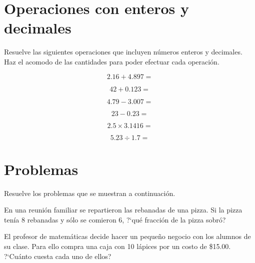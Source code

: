 \documentclass[11pt]{article}
\begin{document}
\vspace{0.7cm}

\section{Operaciones con enteros y decimales}
Resuelve las siguientes operaciones que incluyen n\'umeros enteros y decimales.
Haz el acomodo de las cantidades para poder efectuar cada operaci\'on.

\begin{multicols}{2}

\begin{equation*}    2.16 + 4. 897=          \end{equation*}

\begin{equation*}    42 + 0. 123=            \end{equation*}

\begin{equation*}    4.79 - 3.007=           \end{equation*}

\begin{equation*}    23 - 0.23=              \end{equation*}

\begin{equation*}    2.5 \times 3.1416=      \end{equation*}

\begin{equation*}    5.23 \div 1.7=          \end{equation*}

\end{multicols}

\vspace{1cm}

\section{Problemas}
Resuelve los problemas que se muestran a continuaci\'on.

\vspace{0.5cm}

En una reuni\'on familiar se repartieron las rebanadas de una pizza. Si la pizza
ten\'ia 8 rebanadas y s\'olo se comieron 6, ?`qu\'e fracci\'on de la pizza
sobr\'o?

\vspace{4cm}

El profesor de matem\'aticas decide hacer un peque\~no negocio con los alumnos
de su clase. Para ello compra una caja con 10 l\'apices por un costo de \$15.00.
?`Cu\'anto cuesta cada uno de ellos?
\end{document}
